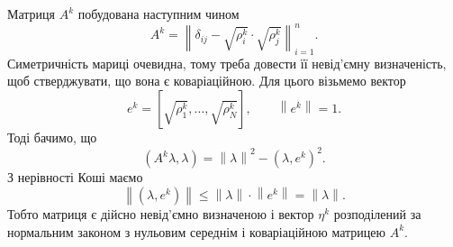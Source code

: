 Матриця $A^k$ побудована наступним чином
\begin{equation*}
  A^k
  = \left\| \delta_{ij} - \sqrt{\rho_i^k} \cdot \sqrt{\rho_j^k} \right\|_{i=1}^n.
\end{equation*}
Симетричність мариці очевидна, тому треба довести її невід’ємну визначеність,
щоб стверджувати, що вона є коваріаційною.
Для цього візьмемо вектор
\begin{equation*}
  e^k = \left[ \sqrt{\rho_1^k}, \dots, \sqrt{\rho_N^k} \right],\qquad
  \left\| e^k \right\| = 1.
\end{equation*}
Тоді бачимо, що
\begin{equation}\label{eq:chi2:quadraticForm}
  \left( A^k \lambda, \lambda \right)
  = \left\| \lambda \right\|^2
    - \left( \lambda, e^k \right)^2.
\end{equation}
З нерівності Коші маємо
\begin{equation*}
  \left\| \left( \lambda, e^k \right) \right\|
  \le \left\| \lambda \right\| \cdot \left\| e^k \right\|
  = \left\| \lambda \right\|.
\end{equation*}
Тобто матриця є дійсно невід’ємно визначеною і вектор $\eta^k$ розподілений
за нормальним законом з нульовим середнім і коваріаційною матрицею $A^k$.

